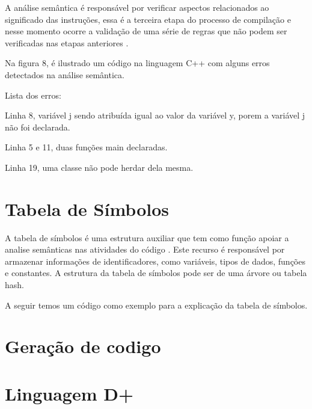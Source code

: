 \documentclass[12pt,oneside,a4paper,chapter=TITLE,section=TITLE,sumario=tradicional]{abntex2}
\begin{document}
A análise semântica é responsável por verificar aspectos relacionados ao significado das instruções, essa é a terceira etapa do processo de compilação e nesse momento ocorre a validação de uma série de regras que não podem ser verificadas nas etapas anteriores \cite{maragon2015}.

Na figura 8, é ilustrado um código na linguagem C++ com alguns erros detectados na análise semântica.

Lista dos erros:

\begin{lista}
	\item Linha 8, variável j sendo atribuída igual ao valor da variável y, porem a variável j não foi declarada.
	\item Linha 5 e 11, duas funções main declaradas.
	\item Linha 19, uma classe não pode herdar dela mesma.
\end{lista}

\begin{figure}[htb]
\end{figure}

\section{Tabela de Símbolos}
\label{sec:tabela-semantica}

A tabela de símbolos é uma estrutura auxiliar que tem como função apoiar a analise semânticas nas atividades do código \cite{ricarte2008}. Este recurso é responsável por armazenar informações de identificadores, como variáveis, tipos de dados, funções e constantes. A estrutura da tabela de símbolos pode ser de uma árvore ou tabela hash.

A seguir temos um código como exemplo para a explicação da tabela de símbolos.

\begin{figure}[htb]
\end{figure}

\section{Geração de codigo}
\label{sec:geracao-de-codigo}

\section{Linguagem D+}
\label{sec:linguagem-d+}
\end{document}

